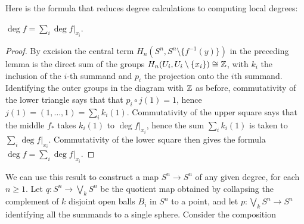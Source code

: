 Here is the formula that reduces degree calculations to computing local
degrees:
\begin{proposition}[2.30]
$\deg f=\sum_i\deg f|_{x_i}$.
\end{proposition}
\begin{proof}
By excision the central term $H_n(S^n,S^n\setminus\{f^{-1}(y)\})$ in the
preceding lemma is the direct sum of the groups
$H_n(U_i,U_i\setminus\{x_i\})\cong\mathbb{Z}$, with $k_i$ the inclusion of the
$i$-th  summand and $p_i$ the projection onto the $i$th
summand. Identifying the outer groups in the diagram with $\mathbb{Z}$ as before,
commutativity of the lower triangle says that that $p_i\circ j(1)=1$, hence
$j(1)=(1,\dotsc,1)=\sum_ik_i(1)$. Commutativity of the upper square says
that the middle $f_*$ takes $k_i(1)$ to $\deg f|_{x_i}$, hence the sum
$\sum_ik_i(1)$ is taken to $\sum_i\deg f|_{x_i}$. Commutativity of the
lower square then gives the formula $\deg f=\sum_i\deg f|_{x_i}$.
\end{proof}
\begin{example}[2.31]
We can use this result to construct a map $S^n\to S^n$ of any given degree,
for each $n\geq 1$. Let $q\colon S^n\to \bigvee_k S^n$ be the quotient map
obtained by collapsing the complement of $k$ disjoint open balls $B_i$ in
$S^n$ to a point, and let $p\colon\bigvee_k S^n\to S^n$ identifying all the
summands to a single sphere. Consider the composition
\end{example}


